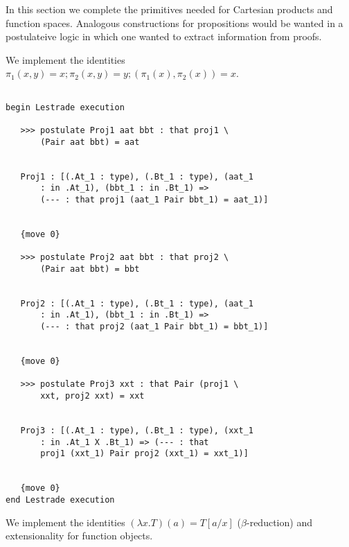 \documentclass[12pt]{article}
\begin{document}
In this section we complete the primitives needed for Cartesian products and function spaces.  Analogous constructions for propositions would be wanted
in a postulateive logic in which one wanted to extract information from proofs.

We implement the identities $\pi_1(x,y)=x; \pi_2(x,y)=y; (\pi_1(x),\pi_2(x))=x$.

\begin{verbatim}

begin Lestrade execution

   >>> postulate Proj1 aat bbt : that proj1 \
       (Pair aat bbt) = aat


   Proj1 : [(.At_1 : type), (.Bt_1 : type), (aat_1 
       : in .At_1), (bbt_1 : in .Bt_1) => 
       (--- : that proj1 (aat_1 Pair bbt_1) = aat_1)]


   {move 0}

   >>> postulate Proj2 aat bbt : that proj2 \
       (Pair aat bbt) = bbt


   Proj2 : [(.At_1 : type), (.Bt_1 : type), (aat_1 
       : in .At_1), (bbt_1 : in .Bt_1) => 
       (--- : that proj2 (aat_1 Pair bbt_1) = bbt_1)]


   {move 0}

   >>> postulate Proj3 xxt : that Pair (proj1 \
       xxt, proj2 xxt) = xxt


   Proj3 : [(.At_1 : type), (.Bt_1 : type), (xxt_1 
       : in .At_1 X .Bt_1) => (--- : that 
       proj1 (xxt_1) Pair proj2 (xxt_1) = xxt_1)]


   {move 0}
end Lestrade execution
\end{verbatim}

We implement the identities $(\lambda x.T)(a) = T[a/x]$ ($\beta$-reduction) and extensionality for function objects.
\end{document}
